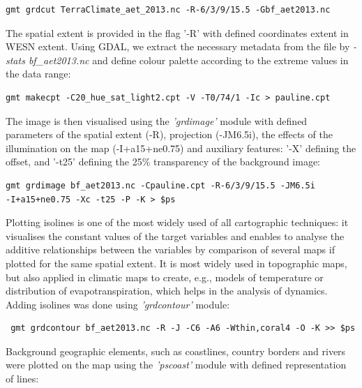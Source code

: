 \documentclass[atmosphere,article,submit,pdftex,moreauthors]{Definitions/mdpi}
\begin{document}
\begin{small}
\begin{verbatim}
gmt grdcut TerraClimate_aet_2013.nc -R-6/3/9/15.5 -Gbf_aet2013.nc
\end{verbatim} 
\end{small}

The spatial extent is provided in the flag '-R' with defined coordinates extent in WESN extent. Using GDAL, we extract the necessary metadata from the file by \emph{-stats bf\_aet2013.nc} and define colour palette according to the extreme values in the data range: 

\begin{small}
\begin{verbatim}
gmt makecpt -C20_hue_sat_light2.cpt -V -T0/74/1 -Ic > pauline.cpt
\end{verbatim} 
\end{small}

The image is then visualised using the \emph{'grdimage'} module with defined parameters of the spatial extent (-R), projection (-JM6.5i), the effects of the illumination on the map (-I+a15+ne0.75) and auxiliary features: '-X' defining the offset, and  '-t25' defining the 25\% transparency of the background image:

\begin{small}
\begin{verbatim}
gmt grdimage bf_aet2013.nc -Cpauline.cpt -R-6/3/9/15.5 -JM6.5i 
-I+a15+ne0.75 -Xc -t25 -P -K > $ps
\end{verbatim} 
\end{small}

 Plotting isolines is one of the most widely used of all cartographic techniques: it visualises the constant values of the target variables and enables to analyse the additive relationships between the variables by comparison of several maps if plotted for the same spatial extent. It is most widely used in topographic maps, but also applied in climatic maps to create, e.g., models of temperature or distribution of evapotranspiration, which helps in the analysis of dynamics. Adding isolines was done using \emph{'grdcontour'} module: 
 
 \begin{small}
 \begin{verbatim}
 gmt grdcontour bf_aet2013.nc -R -J -C6 -A6 -Wthin,coral4 -O -K >> $ps
 \end{verbatim} 
 \end{small}
 
 Background geographic elements, such as coastlines, country borders and rivers were plotted on the map using the \emph{'pscoast'} module with defined representation of lines: 
 
\end{document}

